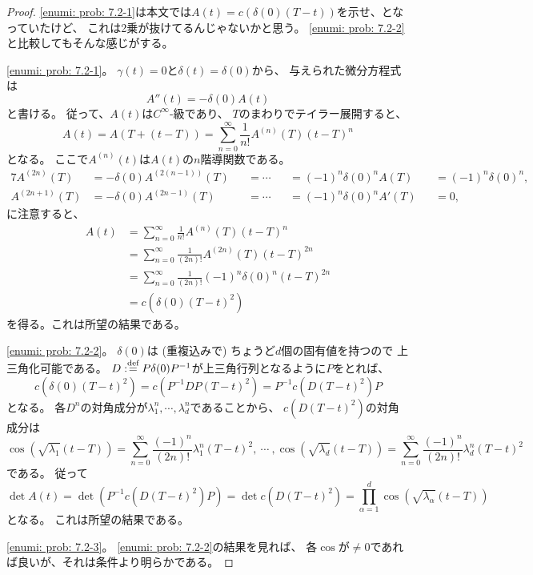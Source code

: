 \documentclass[uplatex]{jsarticle}
\theoremstyle{definition}
\def\dfn{:\overset{\mbox{{\scriptsize def}}}{=}}
\begin{document}
\begin{proof}
  \ref{enumi: prob: 7.2-1}は本文では\(A(t) = c(\delta(0)(T-t))\)を示せ、となっていたけど、
  これは2乗が抜けてるんじゃないかと思う。
  \ref{enumi: prob: 7.2-2}と比較してもそんな感じがする。

  \ref{enumi: prob: 7.2-1}。
  \(\gamma(t)=0\)と\(\delta(t) = \delta(0)\)から、
  与えられた微分方程式は
  \[
  A''(t) = -\delta(0)A(t)
  \]
  と書ける。
  従って、\(A(t)\)は\(C^\infty\)-級であり、
  \(T\)のまわりでテイラー展開すると、
  \[
  A(t) = A(T+(t-T)) = \sum_{n=0}^{\infty} \frac{1}{n!}A^{(n)}(T)(t-T)^n
  \]
  となる。
  ここで\(A^{(n)}(t)\)は\(A(t)\)の\(n\)階導関数である。
  \begin{alignat*}{7}
    A^{(2n)}(T) &= -\delta(0)A^{(2(n-1))}(T)
    &&= \cdots &&= (-1)^n\delta(0)^nA(T) &&= (-1)^n\delta(0)^n, \\
    A^{(2n+1)}(T) &= -\delta(0)A^{(2n-1)}(T)
    &&= \cdots &&= (-1)^n\delta(0)^nA'(T) &&= 0,
  \end{alignat*}
  に注意すると、
  \begin{align*}
    A(t) &= \sum_{n=0}^{\infty} \frac{1}{n!}A^{(n)}(T)(t-T)^n \\
    &= \sum_{n=0}^{\infty} \frac{1}{(2n)!}A^{(2n)}(T)(t-T)^{2n} \\
    &= \sum_{n=0}^{\infty} \frac{1}{(2n)!}(-1)^n\delta(0)^n(t-T)^{2n} \\
    &= c(\delta(0)(T-t)^2)
  \end{align*}
  を得る。これは所望の結果である。

  \ref{enumi: prob: 7.2-2}。
  \(\delta(0)\)は (重複込みで) ちょうど\(d\)個の固有値を持つので
  上三角化可能である。
  \(D\dfn P\delta(0)P^{-1}\)が上三角行列となるように\(P\)をとれば、
  \[
  c(\delta(0)(T-t)^2) = c(P^{-1}DP(T-t)^2)
  = P^{-1}c(D(T-t)^2)P
  \]
  となる。
  各\(D^n\)の対角成分が\(\lambda_1^n,\cdots,\lambda_d^n\)であることから、
  \(c(D(T-t)^2)\)の対角成分は
  \[
  \cos (\sqrt{\lambda_1}(t-T)) =
  \sum_{n=0}^\infty \frac{(-1)^n}{(2n)!}\lambda_1^n(T-t)^2 , \ \cdots \ ,
  \cos (\sqrt{\lambda_d}(t-T)) =
  \sum_{n=0}^\infty \frac{(-1)^n}{(2n)!}\lambda_d^n(T-t)^2
  \]
  である。
  従って
  \[
  \det A(t) = \det (P^{-1}c(D(T-t)^2)P) = \det c(D(T-t)^2)
  = \prod_{\alpha=1}^d \cos (\sqrt{\lambda_\alpha}(t-T))
  \]
  となる。
  これは所望の結果である。

  \ref{enumi: prob: 7.2-3}。
  \ref{enumi: prob: 7.2-2}の結果を見れば、
  各\(\cos\)が\(\neq 0\)であれば良いが、それは条件より明らかである。
\end{proof}
\end{document}
